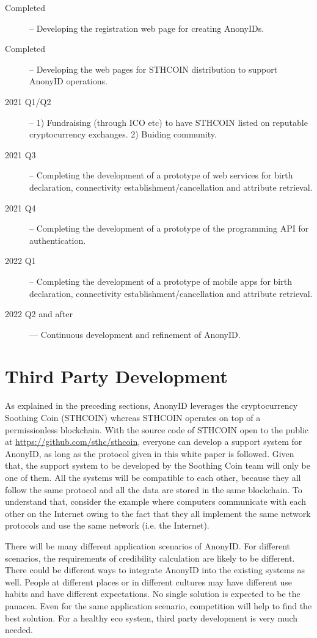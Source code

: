 \documentclass[12pt, a4paper]{article}
\begin{document}
\begin{description}
\item[Completed] -- Developing the registration web page for creating AnonyIDs.
\item[Completed] -- Developing the web pages for STHCOIN distribution to support AnonyID operations.
\item[2021 Q1/Q2] -- 1) Fundraising (through ICO etc) to have STHCOIN listed on reputable cryptocurrency exchanges. 2) Buiding community.
\item[2021 Q3] -- Completing the development of a prototype of web services for birth declaration, connectivity establishment/cancellation and attribute retrieval. 
\item[2021 Q4] -- Completing the development of a prototype of the programming API for authentication.
\item[2022 Q1] -- Completing the development of a prototype of mobile apps for birth declaration, connectivity establishment/cancellation and attribute retrieval. 
\item[2022 Q2 and after] --- Continuous development and refinement of AnonyID.
\end{description}

\section{Third Party Development}

As explained in the preceding sections, AnonyID leverages the cryptocurrency Soothing Coin (STHCOIN) whereas STHCOIN operates on top of a permissionless blockchain. With the source code of STHCOIN open to the public at \href{https://github.com/sthc/sthcoin}{https://github.com/sthc/sthcoin}, everyone can develop a support system for AnonyID, as long as the protocol given in this white paper is followed. Given that, the support system to be developed by the Soothing Coin team will only be one of them. All the systems will be compatible to each other, because they all follow the same protocol and all the data are stored in the same blockchain. To understand that, consider the example where computers communicate with each other on the Internet owing to the fact that they all implement the same network protocols and use the same network (i.e. the Internet).

There will be many different application scenarios of AnonyID. For different scenarios, the requirements of credibility calculation are likely to be different. There could be different ways to integrate AnonyID into the existing systems as well. People at different places or in different cultures may have different use habits and have different expectations.  No single solution is expected to be the panacea. Even for the same application scenario, competition will help to find the best solution. For a healthy eco system, third party development is very much needed.
\end{document}
